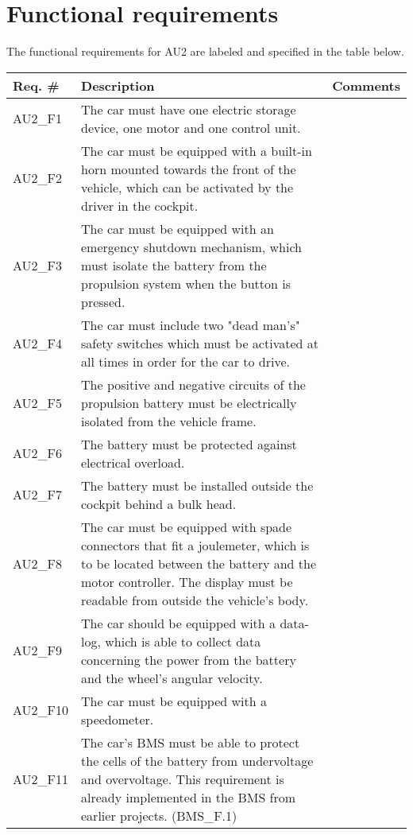 \section{Functional requirements}
The functional requirements for AU2 are labeled and specified in the table below.

\begin{table}[h!]
	\label{FREQ_AU2}
	\centering
	\begin{tabular}{|p{2 cm}|p{7 cm}|p{4 cm}|}
		\hline
		\textbf{Req. \#} & \textbf{Description} & \textbf{Comments} \\\hline
		AU2\_F1		& The car must have one electric storage device, one motor and one control unit. &   \\\hline
		AU2\_F2		& The car must be equipped with a built-in horn mounted towards the front of the vehicle, which can be activated by the driver in the cockpit. &   \\\hline
		AU2\_F3		& The car must be equipped with an emergency shutdown mechanism, which must isolate the battery from the propulsion system when the button is pressed. &   \\\hline
		AU2\_F4		& The car must include two "dead man's" safety switches which must be activated at all times in order for the car to drive. &   \\\hline
		AU2\_F5	& The positive and negative circuits of the propulsion battery  must be electrically isolated from the vehicle frame. &   \\\hline
		AU2\_F6	& 
		The battery must be protected against electrical overload. &   \\\hline
		AU2\_F7		& The battery must be installed outside the cockpit behind a bulk head. &   \\\hline
		AU2\_F8	& The car must be equipped with spade connectors that fit a joulemeter, which is to be located between the battery and the motor controller. The display must be readable from outside the vehicle's body. &   \\\hline
		AU2\_F9	& The car should be equipped with a data-log, which is able to collect data concerning the power from the battery and the wheel's angular velocity. &   \\\hline
		AU2\_F10	& The car must be equipped with a speedometer. &   \\\hline
		AU2\_F11	& The car's BMS must be able to protect the cells of the battery from undervoltage and overvoltage. This requirement is already implemented in the BMS from earlier projects. (BMS\_F.1) \fxnote{reference to 2013BMS Documentation} &   \\\hline

\end{tabular}
\end{table}
